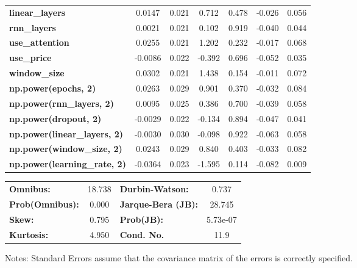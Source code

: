 \begin{center}
\begin{tabular}{lcccccc}
\textbf{linear\_layers}              &       0.0147  &        0.021     &     0.712  &         0.478        &       -0.026    &        0.056     \\
\textbf{rnn\_layers}                 &       0.0021  &        0.021     &     0.102  &         0.919        &       -0.040    &        0.044     \\
\textbf{use\_attention}              &       0.0255  &        0.021     &     1.202  &         0.232        &       -0.017    &        0.068     \\
\textbf{use\_price}                  &      -0.0086  &        0.022     &    -0.392  &         0.696        &       -0.052    &        0.035     \\
\textbf{window\_size}                &       0.0302  &        0.021     &     1.438  &         0.154        &       -0.011    &        0.072     \\
\textbf{np.power(epochs, 2)}         &       0.0263  &        0.029     &     0.901  &         0.370        &       -0.032    &        0.084     \\
\textbf{np.power(rnn\_layers, 2)}    &       0.0095  &        0.025     &     0.386  &         0.700        &       -0.039    &        0.058     \\
\textbf{np.power(dropout, 2)}        &      -0.0029  &        0.022     &    -0.134  &         0.894        &       -0.047    &        0.041     \\
\textbf{np.power(linear\_layers, 2)} &      -0.0030  &        0.030     &    -0.098  &         0.922        &       -0.063    &        0.058     \\
\textbf{np.power(window\_size, 2)}   &       0.0243  &        0.029     &     0.840  &         0.403        &       -0.033    &        0.082     \\
\textbf{np.power(learning\_rate, 2)} &      -0.0364  &        0.023     &    -1.595  &         0.114        &       -0.082    &        0.009     \\
\bottomrule
\end{tabular}
\begin{tabular}{lclc}
\textbf{Omnibus:}       & 18.738 & \textbf{  Durbin-Watson:     } &    0.737  \\
\textbf{Prob(Omnibus):} &  0.000 & \textbf{  Jarque-Bera (JB):  } &   28.745  \\
\textbf{Skew:}          &  0.795 & \textbf{  Prob(JB):          } & 5.73e-07  \\
\textbf{Kurtosis:}      &  4.950 & \textbf{  Cond. No.          } &     11.9  \\
\bottomrule
\end{tabular}
\end{center}

Notes: \newline
 [1] Standard Errors assume that the covariance matrix of the errors is correctly specified.